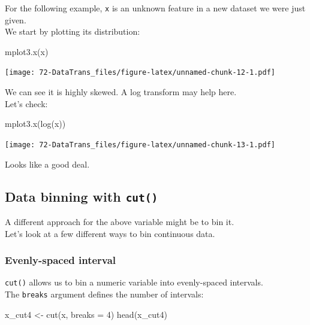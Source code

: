\documentclass[
]{book}
\newenvironment{Shaded}{\begin{snugshade}}{\end{snugshade}}
\newcommand{\AttributeTok}[1]{\textcolor[rgb]{0.77,0.63,0.00}{#1}}
\newcommand{\DecValTok}[1]{\textcolor[rgb]{0.00,0.00,0.81}{#1}}
\newcommand{\FunctionTok}[1]{\textcolor[rgb]{0.00,0.00,0.00}{#1}}
\newcommand{\NormalTok}[1]{#1}
\newcommand{\OtherTok}[1]{\textcolor[rgb]{0.56,0.35,0.01}{#1}}
\begin{document}
For the following example, \texttt{x} is an unknown feature in a new dataset we were just given.\\
We start by plotting its distribution:

\begin{Shaded}
\begin{Highlighting}[]
\FunctionTok{mplot3.x}\NormalTok{(x)}
\end{Highlighting}
\end{Shaded}

\texttt{[image: 72-DataTrans\_files/figure-latex/unnamed-chunk-12-1.pdf]}

We can see it is highly skewed. A log transform may help here.\\
Let's check:

\begin{Shaded}
\begin{Highlighting}[]
\FunctionTok{mplot3.x}\NormalTok{(}\FunctionTok{log}\NormalTok{(x))}
\end{Highlighting}
\end{Shaded}

\texttt{[image: 72-DataTrans\_files/figure-latex/unnamed-chunk-13-1.pdf]}

Looks like a good deal.

\hypertarget{data-binning-with-cut}{%
\subsection{\texorpdfstring{Data binning with \texttt{cut()}}{Data binning with cut()}}\label{data-binning-with-cut}}

A different approach for the above variable might be to bin it.\\
Let's look at a few different ways to bin continuous data.

\hypertarget{evenly-spaced-interval}{%
\subsubsection{Evenly-spaced interval}\label{evenly-spaced-interval}}

\texttt{cut()} allows us to bin a numeric variable into evenly-spaced intervals.\\
The \texttt{breaks} argument defines the number of intervals:

\begin{Shaded}
\begin{Highlighting}[]
\NormalTok{x\_cut4 }\OtherTok{\textless{}{-}} \FunctionTok{cut}\NormalTok{(x, }\AttributeTok{breaks =} \DecValTok{4}\NormalTok{)}
\FunctionTok{head}\NormalTok{(x\_cut4)}
\end{Highlighting}
\end{Shaded}
\end{document}
